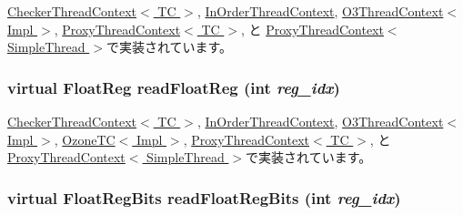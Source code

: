 \hyperlink{classCheckerThreadContext_a78f8bb511732f8abab3bd11a18d32072}{CheckerThreadContext$<$ TC $>$}, \hyperlink{classInOrderThreadContext_a78f8bb511732f8abab3bd11a18d32072}{InOrderThreadContext}, \hyperlink{classO3ThreadContext_a576cfb60d7a873b30da62dc738e0e8ce}{O3ThreadContext$<$ Impl $>$}, \hyperlink{classProxyThreadContext_a78f8bb511732f8abab3bd11a18d32072}{ProxyThreadContext$<$ TC $>$}, と \hyperlink{classProxyThreadContext_a78f8bb511732f8abab3bd11a18d32072}{ProxyThreadContext$<$ SimpleThread $>$}で実装されています。\hypertarget{classThreadContext_a7883083f396dee2160e4b8640d02f5f6}{
\subsubsection[{readFloatReg}]{\setlength{\rightskip}{0pt plus 5cm}virtual {\bf FloatReg} readFloatReg (int {\em reg\_\-idx})}}
\label{classThreadContext_a7883083f396dee2160e4b8640d02f5f6}


\hyperlink{classCheckerThreadContext_a2f97d83baef4fbda00b7f7f62779752f}{CheckerThreadContext$<$ TC $>$}, \hyperlink{classInOrderThreadContext_a2f97d83baef4fbda00b7f7f62779752f}{InOrderThreadContext}, \hyperlink{classO3ThreadContext_ad85a5b48ebe475a9b1d1d3f31b51b942}{O3ThreadContext$<$ Impl $>$}, \hyperlink{classOzoneCPU_1_1OzoneTC_a34ccc34c22b261f80e9b0d0803aac24b}{OzoneTC$<$ Impl $>$}, \hyperlink{classProxyThreadContext_a2f97d83baef4fbda00b7f7f62779752f}{ProxyThreadContext$<$ TC $>$}, と \hyperlink{classProxyThreadContext_a2f97d83baef4fbda00b7f7f62779752f}{ProxyThreadContext$<$ SimpleThread $>$}で実装されています。\hypertarget{classThreadContext_a66bf9e1bf11ad15d1903209dd37014c5}{
\subsubsection[{readFloatRegBits}]{\setlength{\rightskip}{0pt plus 5cm}virtual {\bf FloatRegBits} readFloatRegBits (int {\em reg\_\-idx})}}
\label{classThreadContext_a66bf9e1bf11ad15d1903209dd37014c5}


